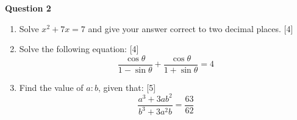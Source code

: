 \newpage
\par
\noindent
\textbf{Question 2}\\
\begin{enumerate}[label=(\roman*)]

    \item Solve $x^2 + 7x = 7$ and give your answer correct to two 
        decimal places. \hfill [4]

    \item Solve the following equation: \hfill [4]
        \[
            \frac{\cos \theta}{1 - \sin \theta} + \frac{\cos \theta}{1 + \sin \theta} = 4
        \]

    \item Find the value of $a:b$, given that: \hfill [5]
        \[
            \frac{a^3 + 3ab^2}{b^3 + 3a^2b} = \frac{63}{62}
        \]

\end{enumerate}
